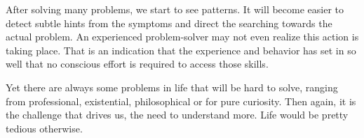 After solving many problems, we start to see patterns. It will become easier to detect subtle hints from the symptoms and direct the searching towards the actual problem. An experienced problem-solver may not even realize this action is taking place. That is an indication that the experience and behavior has set in so well that no conscious effort is required to access those skills.

Yet there are always some problems in life that will be hard to solve, ranging from professional, existential, philosophical or for pure curiosity. Then again, it is the challenge that drives us, the need to understand more. Life would be pretty tedious otherwise.
